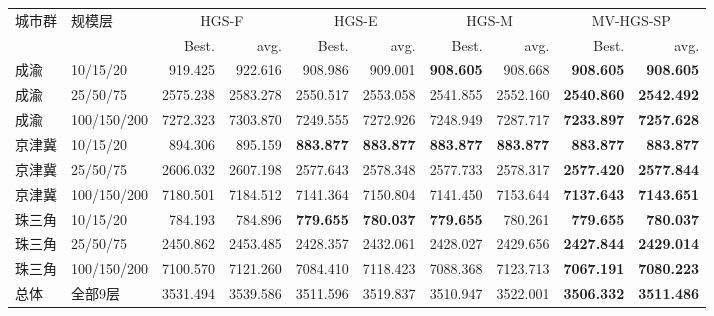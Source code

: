 \begin{tabular}{@{}llrrrrrrrr@{}}
\toprule
城市群 & 规模层 & \multicolumn{2}{c}{HGS-F} & \multicolumn{2}{c}{HGS-E} & \multicolumn{2}{c}{HGS-M} & \multicolumn{2}{c}{MV-HGS-SP}\\
 &  & Best. & avg. & Best. & avg. & Best. & avg. & Best. & avg.\\
\midrule
成渝 & 10/15/20 & 919.425 & 922.616 & 908.986 & 909.001 & \textbf{908.605} & 908.668 & \textbf{908.605} & \textbf{908.605} \\
成渝 & 25/50/75 & 2575.238 & 2583.278 & 2550.517 & 2553.058 & 2541.855 & 2552.160 & \textbf{2540.860} & \textbf{2542.492} \\
成渝 & 100/150/200 & 7272.323 & 7303.870 & 7249.555 & 7272.926 & 7248.949 & 7287.717 & \textbf{7233.897} & \textbf{7257.628} \\
京津冀 & 10/15/20 & 894.306 & 895.159 & \textbf{883.877} & \textbf{883.877} & \textbf{883.877} & \textbf{883.877} & \textbf{883.877} & \textbf{883.877} \\
京津冀 & 25/50/75 & 2606.032 & 2607.198 & 2577.643 & 2578.348 & 2577.733 & 2578.317 & \textbf{2577.420} & \textbf{2577.844} \\
京津冀 & 100/150/200 & 7180.501 & 7184.512 & 7141.364 & 7150.804 & 7141.450 & 7153.644 & \textbf{7137.643} & \textbf{7143.651} \\
珠三角 & 10/15/20 & 784.193 & 784.896 & \textbf{779.655} & \textbf{780.037} & \textbf{779.655} & 780.261 & \textbf{779.655} & \textbf{780.037} \\
珠三角 & 25/50/75 & 2450.862 & 2453.485 & 2428.357 & 2432.061 & 2428.027 & 2429.656 & \textbf{2427.844} & \textbf{2429.014} \\
珠三角 & 100/150/200 & 7100.570 & 7121.260 & 7084.410 & 7118.423 & 7088.368 & 7123.713 & \textbf{7067.191} & \textbf{7080.223} \\
总体 & 全部9层 & 3531.494 & 3539.586 & 3511.596 & 3519.837 & 3510.947 & 3522.001 & \textbf{3506.332} & \textbf{3511.486} \\
\bottomrule
\end{tabular}
